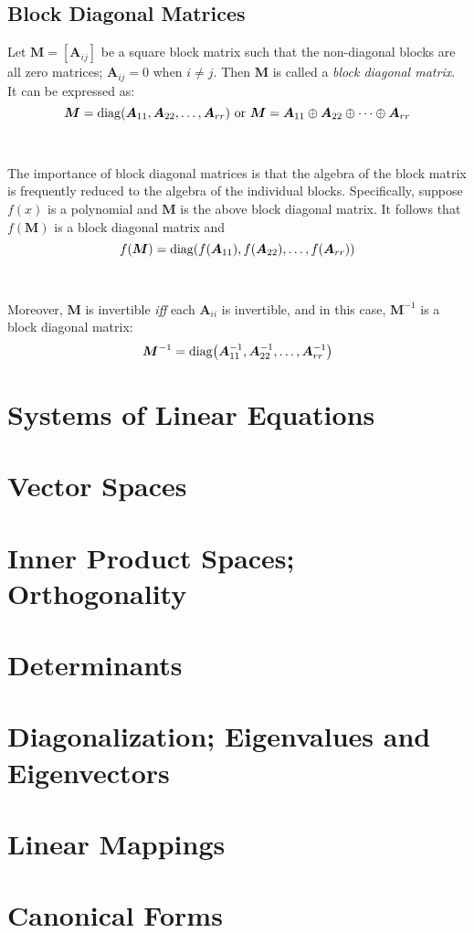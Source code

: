 \documentclass[../setup.tex]{subfiles}
\newcommand{\diag}[1]{\operatorname{diag}\mleft(#1\mright)}
\begin{document}
\subsection{Block Diagonal Matrices}
Let $\bm{M} = [\bm{A}_{ij}]$ be a square block matrix such that the non-diagonal blocks are all zero matrices; $\bm{A}_{ij} = 0$ when $i \neq j$. Then $\bm{M}$ is called a \textit{block diagonal matrix}. It can be expressed as:
\[\bm{M} = \diag{\bm{A}_{11}, \bm{A}_{22}, \dots, \bm{A}_{rr}} \text{ or } \bm{M} = \bm{A}_{11} \oplus \bm{A}_{22} \oplus \dots \oplus \bm{A}_{rr}\]
\phantom \\ \\
The importance of block diagonal matrices is that the algebra of the block matrix is frequently reduced to the algebra of the individual blocks. Specifically, suppose $f(x)$ is a polynomial and $\bm{M}$ is the above block diagonal matrix. It follows that $f(\bm{M})$ is a block diagonal matrix and 
\[f(\bm{M}) = \diag{f(\bm{A}_{11}), f(\bm{A}_{22}), \dots, f(\bm{A}_{rr})}\]
\phantom \\ \\
Moreover, $\bm{M}$ is invertible \textit{iff} each $\bm{A}_{ii}$ is invertible, and in this case, $\bm{M}^{-1}$ is a block diagonal matrix:
\[\bm{M}^{-1} = \diag{\bm{A}_{11}^{-1}, \bm{A}_{22}^{-1}, \dots, \bm{A}_{rr}^{-1}}\]


\section{Systems of Linear Equations}



\section{Vector Spaces}



\section{Inner Product Spaces; Orthogonality}



\section{Determinants}



\section{Diagonalization; Eigenvalues and Eigenvectors}



\section{Linear Mappings}



\section{Canonical Forms}
\end{document}
